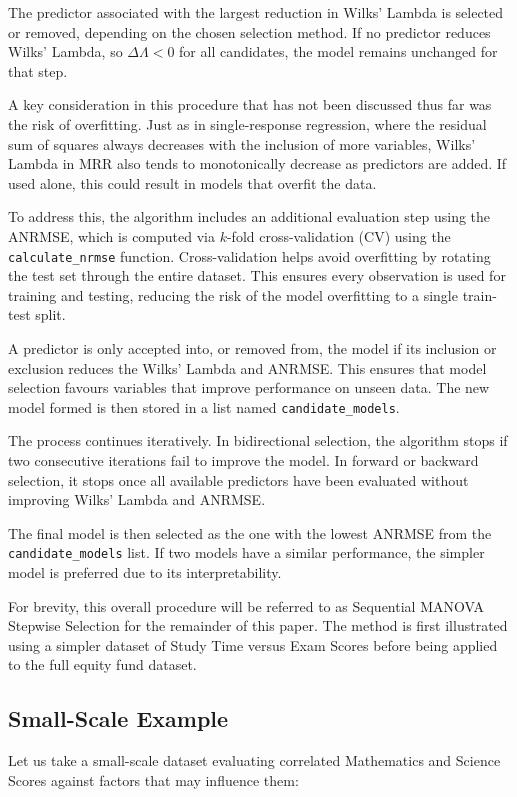 \documentclass[11pt]{report} %
\begin{document}
The predictor associated with the largest reduction in Wilks' Lambda is selected or removed, depending on the chosen selection method. If no predictor reduces Wilks' Lambda, so \( \Delta \Lambda < 0 \) for all candidates, the model remains unchanged for that step.

A key consideration in this procedure that has not been discussed thus far was the risk of overfitting. Just as in single-response regression, where the residual sum of squares always decreases with the inclusion of more variables, Wilks’ Lambda in MRR also tends to monotonically decrease as predictors are added. If used alone, this could result in models that overfit the data.

To address this, the algorithm includes an additional evaluation step using the ANRMSE, which is computed via \(k\)-fold cross-validation (CV) using the \texttt{calculate\_nrmse} function.
Cross-validation helps avoid overfitting by rotating the test set through the entire dataset. This ensures every observation is used for training and testing, reducing the risk of the model overfitting to a single train-test split.

A predictor is only accepted into, or removed from, the model if its inclusion or exclusion reduces the Wilks’ Lambda and ANRMSE. This ensures that model selection favours variables that improve performance on unseen data. The new model formed is then stored in a list named \texttt{candidate\_models}.

The process continues iteratively. In bidirectional selection, the algorithm stops if two consecutive iterations fail to improve the model. In forward or backward selection, it stops once all available predictors have been evaluated without improving Wilks' Lambda and ANRMSE.

The final model is then selected as the one with the lowest ANRMSE from the \texttt{candidate\_models} list. If two models have a similar performance, the simpler model is preferred due to its interpretability.

For brevity, this overall procedure will be referred to as Sequential MANOVA Stepwise Selection for the remainder of this paper. The method is first illustrated using a simpler dataset of Study Time versus Exam Scores before being applied to the full equity fund dataset.

\subsection{Small-Scale Example}
Let us take a small-scale dataset evaluating correlated Mathematics and Science Scores against factors that may influence them:
\end{document}
